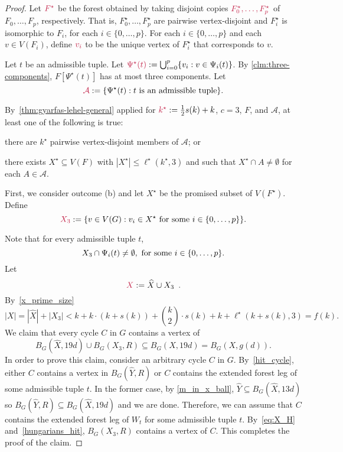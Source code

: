 \documentclass{patmorin}
\newcommand{\pat}[1]{\textcolor{Blue}{[Pat: #1]}}
\newcommand{\gwen}[1]{\textcolor{Purple}{Gwen: #1}}
\DeclarePairedDelimiter\set{\{}{\}}
\begin{document}
\begin{proof}
Let $\mathdefin{F^{\star}}$ be the forest obtained by taking 
disjoint copies $\mathdefin{F_0^\star,\ldots, F_p^\star}$ of $F_0,\ldots, F_p$, respectively.  That is,  $F_0^\star,\ldots, F_p^\star$ are pairwise vertex-disjoint and $F_i^\star$ is isomorphic to $F_i$, for each $i\in\{0,\ldots,p\}$.
For each $i\in\{0,\ldots,p\}$ and each $v\in V(F_i)$, define $\mathdefin{v_i}$ to be the unique vertex of $F^\star_i$ that corresponds to $v$.

Let $t$ be an admissible tuple. 
Let $\mathdefin{\Psi^\star(t)}:=\bigcup_{i=0}^p \{v_i:v\in \Psi_i(t)\}$.
By \cref{clm:three-components}, $F[\Psi^\star(t)]$ has at most three components. 
Let
\[
\mathdefin{\mathcal{A}}:=\{\Psi^\star(t):\text{$t$ is an admissible tuple}\}.
\]

By~\cref{thm:gyarfas-lehel-general} applied for
$\mathdefin{k^\star}:=\tfrac{1}{2}s(k)+k$, $c=3$, $F$, and $\mathcal{A}$, at least one of the following is true:
\begin{enumerate*}[label=(\alph*),ref=\alph*]
  \item there are $k^\star$ pairwise vertex-disjoint members of $\mathcal{A}$; or 
  \item there exists $X^\star\subseteq V(F)$ with $|X^\star|\leq \ell^\star(k^\star,3)$ and such that $X^\star \cap A\neq\emptyset$ for each $A\in \mathcal{A}$.
\end{enumerate*}

First, we consider outcome (b) and let $X^\star$ be the promised subset of $V(F^\star)$.
Define 
\[
\mathdefin{X_3}:=\set{v\in V(G):v_i\in X^\star \textrm{ for some $i\in\set{0,\ldots,p}$}}.
\]


Note that 
for every admissible tuple $t$,
\begin{equation}\label{eq:X_H}
X_3 \cap \Psi_i(t) \neq\emptyset,\ \textrm{for some $i\in\set{0,\ldots,p}$.}
\end{equation}
Let
\[
\mathdefin{X}:=\widehat{X} \cup X_3 \enspace .
\]
By~\eqref{x_prime_size}
\[
|X| = |\widehat{X}| + |X_3| < \textstyle k + k\cdot (k+s(k)) + \binom{k}{2}\cdot s(k) + k + \ell^\star(k+s(k),3) = f(k).
\]
We claim that every cycle $C$ in $G$ contains a vertex of 
\[
B_G(\widehat{X},19d)\cup B_G(X_3,R)\subseteq B_G(X,19d) = B_G(X,g(d)).
\]
In order to prove this claim, consider an arbitrary cycle $C$ in $G$. 
By~\cref{hit_cycle}, either $C$ contains a vertex in $B_G(\widehat{Y},R)$ or $C$ contains the extended forest leg of some admissible tuple $t$. 
In the former case, by \eqref{m_in_x_ball}, $\widehat{Y}\subseteq B_G(\widehat{X},13d)$ so $B_G(\widehat{Y},R)\subseteq B_G(\widehat{X},19d)$  and we are done. 
Therefore, we can assume that $C$ contains the extended forest leg of $W_t$ for some admissible tuple $t$. 
By~\eqref{eq:X_H} and~\cref{hungarians_hit}, 
$B_G(X_3,R)$ contains a vertex of $C$.
This completes the proof of the claim.


\end{proof}
\end{document}
